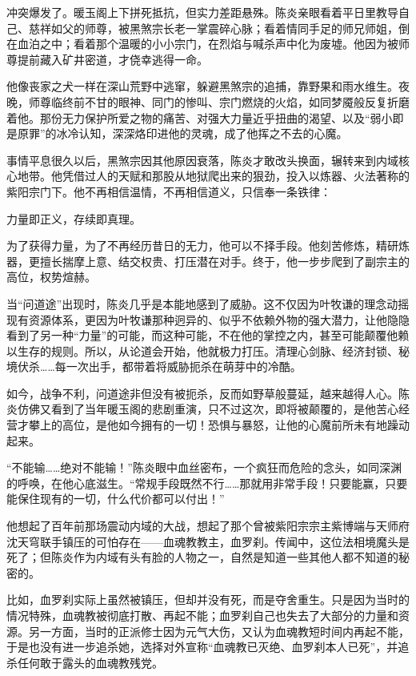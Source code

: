 冲突爆发了。暖玉阁上下拼死抵抗，但实力差距悬殊。陈炎亲眼看着平日里教导自己、慈祥如父的师尊，被黑煞宗长老一掌震碎心脉；看着情同手足的师兄师姐，倒在血泊之中；看着那个温暖的小小宗门，在烈焰与喊杀声中化为废墟。他因为被师尊提前藏入矿井密道，才侥幸逃得一命。

他像丧家之犬一样在深山荒野中逃窜，躲避黑煞宗的追捕，靠野果和雨水维生。夜晚，师尊临终前不甘的眼神、同门的惨叫、宗门燃烧的火焰，如同梦魇般反复折磨着他。那份无力保护所爱之物的痛苦、对强大力量近乎扭曲的渴望、以及“弱小即是原罪”的冰冷认知，深深烙印进他的灵魂，成了他挥之不去的心魔。

事情平息很久以后，黑煞宗因其他原因衰落，陈炎才敢改头换面，辗转来到内域核心地带。他凭借过人的天赋和那股从地狱爬出来的狠劲，投入以炼器、火法著称的紫阳宗门下。他不再相信温情，不再相信道义，只信奉一条铁律：

\vspace{2em}

力量即正义，存续即真理。

\vspace{2em}

为了获得力量，为了不再经历昔日的无力，他可以不择手段。他刻苦修炼，精研炼器，更擅长揣摩上意、结交权贵、打压潜在对手。终于，他一步步爬到了副宗主的高位，权势煊赫。

当“问道途”出现时，陈炎几乎是本能地感到了威胁。这不仅因为叶牧谦的理念动摇现有资源体系，更因为叶牧谦那种迥异的、似乎不依赖外物的强大潜力，让他隐隐看到了另一种“力量”的可能，而这种可能，不在他的掌控之内，甚至可能颠覆他赖以生存的规则。所以，从论道会开始，他就极力打压。清理心剑脉、经济封锁、秘境伏杀……每一次出手，都带着将威胁扼杀在萌芽中的冷酷。

如今，战争不利，问道途非但没有被扼杀，反而如野草般蔓延，越来越得人心。陈炎仿佛又看到了当年暖玉阁的悲剧重演，只不过这次，即将被颠覆的，是他苦心经营才攀上的高位，是他如今拥有的一切！恐惧与暴怒，让他的心魔前所未有地躁动起来。

“不能输……绝对不能输！”陈炎眼中血丝密布，一个疯狂而危险的念头，如同深渊的呼唤，在他心底滋生。“常规手段既然不行……那就用非常手段！只要能赢，只要能保住现有的一切，什么代价都可以付出！”

他想起了百年前那场震动内域的大战，想起了那个曾被紫阳宗宗主紫博端与天师府沈天穹联手镇压的可怕存在——血魂教教主，血罗刹。传闻中，这位法相境魔头是死了；但陈炎作为内域有头有脸的人物之一，自然是知道一些其他人都不知道的秘密的。

比如，血罗刹实际上虽然被镇压，但却并没有死，而是夺舍重生。只是因为当时的情况特殊，血魂教被彻底打散、再起不能；血罗刹自己也失去了大部分的力量和资源。另一方面，当时的正派修士因为元气大伤，又认为血魂教短时间内再起不能，于是也没有进一步追杀她，选择对外宣称“血魂教已灭绝、血罗刹本人已死”，并追杀任何敢于露头的血魂教残党。

